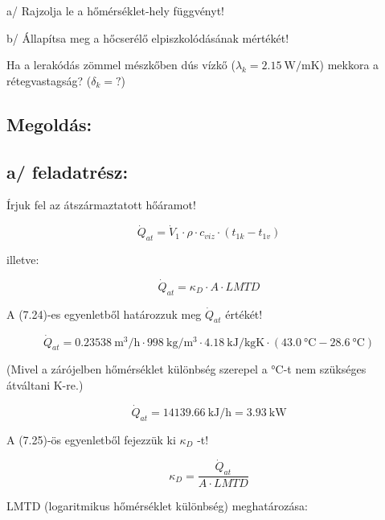 a/ Rajzolja le a hőmérséklet-hely függvényt!

b/ Állapítsa meg a hőcserélő elpiszkolódásának mértékét!

Ha a lerakódás zömmel mészkőben dús vízkő ($\lambda_k =\SI{2.15}{\watt\per\meter\kelvin} $) mekkora a rétegvastagság? ($\delta_k =?$)

\pagebreak

\subsection*{Megoldás:}

\subsection*{a/ feladatrész:}

Írjuk fel az átszármaztatott hőáramot!

\begin{equation}
	{\dot{Q}}_{at}={\dot{V}}_1\cdot\rho\cdot c_{viz}\cdot (t_{1k}-t_{1v})
\end{equation}

illetve:

\begin{equation}
	{\dot{Q}}_{at} = \kappa_D\cdot A\cdot LMTD
\end{equation}

A (7.24)-es egyenletből határozzuk meg ${\dot{Q}}_{at}$ értékét!

\begin{equation}
	{\dot{Q}}_{at} = \SI{0.23538}{\meter\cubed\per\hour} \cdot \SI{998}{\kilo\gram\per\meter\cubed} \cdot \SI{4,18}{\kilo\joule\per\kilo\gram\kelvin} \cdot (\SI{43,0}{\celsius} - \SI{28,6}{\celsius}) 
\end{equation}

(Mivel a zárójelben hőmérséklet különbség szerepel a °C-t nem szükséges átváltani K-re.)

\begin{equation}
	{\dot{Q}}_{at} = \SI{14139.66}{\kilo\joule\per\hour} = \SI {3.93}{\kilo\watt}
\end{equation}

A (7.25)-ös egyenletből fejezzük ki $\kappa_D$ -t!

\begin{equation}
	\kappa_D = \frac{{\dot{Q}}_{at}}{A \cdot LMTD}
\end{equation}

LMTD (logaritmikus hőmérséklet különbség) meghatározása:

